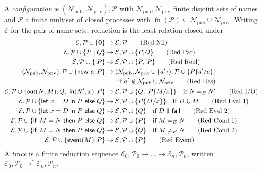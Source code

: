 \documentclass[11pt]{article}
\theoremstyle{definition}
\theoremstyle{plain}
\theoremstyle{remark}
\newcommand{\fn}{\operatorname{fn}}
\begin{document}
A \textit{configuration} is $(\mathcal{N}_{\mathrm{pub}},\mathcal{N}_{\mathrm{priv}}),\mathcal{P}$ with $\mathcal{N}_{\mathrm{pub}},\mathcal{N}_{\mathrm{priv}}$ finite disjoint sets of names and $\mathcal{P}$ a finite multiset of closed processes with $\fn(\mathcal{P})\subseteq\mathcal{N}_{\mathrm{pub}}\cup\mathcal{N}_{\mathrm{priv}}$. Writing $\mathcal{E}$ for the pair of name sets, reduction is the least relation closed under
\begin{align*}
\mathcal{E},\mathcal{P}\cup\{\mathbf{0}\}&\to\mathcal{E},\mathcal{P} \tag{Red Nil}\\
\mathcal{E},\mathcal{P}\cup\{P\mid Q\}&\to\mathcal{E},\mathcal{P}\cup\{P,Q\} \tag{Red Par}\\
\mathcal{E},\mathcal{P}\cup\{!P\}&\to\mathcal{E},\mathcal{P}\cup\{P,!P\} \tag{Red Repl}\\
(\mathcal{N}_{\mathrm{pub}},\mathcal{N}_{\mathrm{priv}}),\mathcal{P}\cup\{\mathsf{new}\ a;P\}&\to(\mathcal{N}_{\mathrm{pub}},\mathcal{N}_{\mathrm{priv}}\cup\{a'\}),\mathcal{P}\cup\{P\{a'/a\}\}\notag\\
&\qquad\text{if } a'\notin\mathcal{N}_{\mathrm{pub}}\cup\mathcal{N}_{\mathrm{priv}} \tag{Red Res}\\
\mathcal{E},\mathcal{P}\cup\{\mathsf{out}(N,M);Q,\ \mathsf{in}(N',x);P\}&\to\mathcal{E},\mathcal{P}\cup\{Q,\ P\{M/x\}\}\quad\text{if } N=_E N' \tag{Red I/O}\\
\mathcal{E},\mathcal{P}\cup\{\mathsf{let}\ x=D\ \mathsf{in}\ P\ \mathsf{else}\ Q\}&\to\mathcal{E},\mathcal{P}\cup\{P\{M/x\}\}\quad\text{if } D\Downarrow M \tag{Red Eval 1}\\
\mathcal{E},\mathcal{P}\cup\{\mathsf{let}\ x=D\ \mathsf{in}\ P\ \mathsf{else}\ Q\}&\to\mathcal{E},\mathcal{P}\cup\{Q\}\quad\text{if } D\Downarrow\mathsf{fail} \tag{Red Eval 2}\\
\mathcal{E},\mathcal{P}\cup\{\mathsf{if}\ M=N\ \mathsf{then}\ P\ \mathsf{else}\ Q\}&\to\mathcal{E},\mathcal{P}\cup\{P\}\quad\text{if } M=_E N \tag{Red Cond 1}\\
\mathcal{E},\mathcal{P}\cup\{\mathsf{if}\ M=N\ \mathsf{then}\ P\ \mathsf{else}\ Q\}&\to\mathcal{E},\mathcal{P}\cup\{Q\}\quad\text{if } M\ne_E N \tag{Red Cond 2}\\
\mathcal{E},\mathcal{P}\cup\{\mathsf{event}(M);P\}&\to\mathcal{E},\mathcal{P}\cup\{P\} \tag{Red Event}
\end{align*}
A \textit{trace} is a finite reduction sequence $\mathcal{E}_0,\mathcal{P}_0\to\dots\to\mathcal{E}_n,\mathcal{P}_n$, written $\mathcal{E}_0,\mathcal{P}_0\to^*\mathcal{E}_n,\mathcal{P}_n$.
\end{document}
